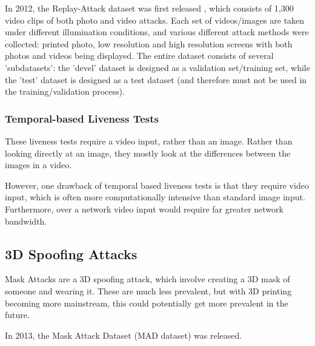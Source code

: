 \documentclass[10pt,a4paper]{article}
\begin{document}
        In 2012, the Replay-Attack dataset was first released , which consists of 1,300 video clips of both photo and video attacks. Each
        set of videos/images are taken under different illumination conditions, and various different attack methods were collected: printed photo, low resolution and high resolution screens with both photos and 
        videos being displayed. The entire dataset consists of several 'subdatasets': the 'devel' dataset is designed as a validation set/training set, while
        the 'test' dataset is designed as a test dataset (and therefore must not be used in the training/validation process). \cite{ReplayAttackDataset}


        \subsubsection{Temporal-based Liveness Tests}
        These liveness tests require a video input, rather than an image. Rather than looking directly at an image, they mostly look at the differences between the images in a video.
        

        However, one drawback of temporal based liveness tests is that they require video input, which is often more computationally intensive than standard image input. Furthermore, over a network video input would require
        far greater network bandwidth.

        
    \subsection{3D Spoofing Attacks}
        Mask Attacks are a 3D spoofing attack, which involve creating a 3D mask of someone and wearing it. \cite{FaceSpoofingAttacksStudy} These are much less prevalent, but with 3D printing becoming more mainstream, this
        could potentially get more prevalent in the future.

        In 2013, the Mask Attack Dataset (MAD dataset) was released. \cite{3DMadDataset}

\end{document}
